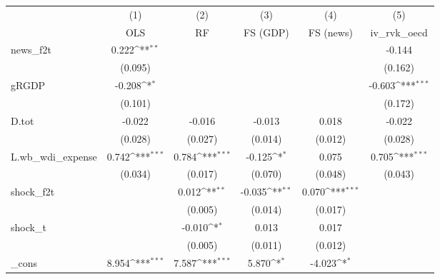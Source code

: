 {
\def\sym#1{\ifmmode^{#1}\else\(^{#1}\)\fi}
\begin{tabular}{l*{5}{c}}
\toprule
            &\multicolumn{1}{c}{(1)}&\multicolumn{1}{c}{(2)}&\multicolumn{1}{c}{(3)}&\multicolumn{1}{c}{(4)}&\multicolumn{1}{c}{(5)}\\
            &\multicolumn{1}{c}{OLS}&\multicolumn{1}{c}{RF}&\multicolumn{1}{c}{FS (GDP)}&\multicolumn{1}{c}{FS (news)}&\multicolumn{1}{c}{iv\_rvk\_oecd}\\
\midrule
news\_f2t    &       0.222\sym{**} &                     &                     &                     &      -0.144         \\
            &     (0.095)         &                     &                     &                     &     (0.162)         \\
\addlinespace
gRGDP       &      -0.208\sym{*}  &                     &                     &                     &      -0.603\sym{***}\\
            &     (0.101)         &                     &                     &                     &     (0.172)         \\
\addlinespace
D.tot       &      -0.022         &      -0.016         &      -0.013         &       0.018         &      -0.022         \\
            &     (0.028)         &     (0.027)         &     (0.014)         &     (0.012)         &     (0.028)         \\
\addlinespace
L.wb\_wdi\_expense&       0.742\sym{***}&       0.784\sym{***}&      -0.125\sym{*}  &       0.075         &       0.705\sym{***}\\
            &     (0.034)         &     (0.017)         &     (0.070)         &     (0.048)         &     (0.043)         \\
\addlinespace
shock\_f2t   &                     &       0.012\sym{**} &      -0.035\sym{**} &       0.070\sym{***}&                     \\
            &                     &     (0.005)         &     (0.014)         &     (0.017)         &                     \\
\addlinespace
shock\_t     &                     &      -0.010\sym{*}  &       0.013         &       0.017         &                     \\
            &                     &     (0.005)         &     (0.011)         &     (0.012)         &                     \\
\addlinespace
\_cons      &       8.954\sym{***}&       7.587\sym{***}&       5.870\sym{*}  &      -4.023\sym{*}  &                     \\

\end{tabular}}
